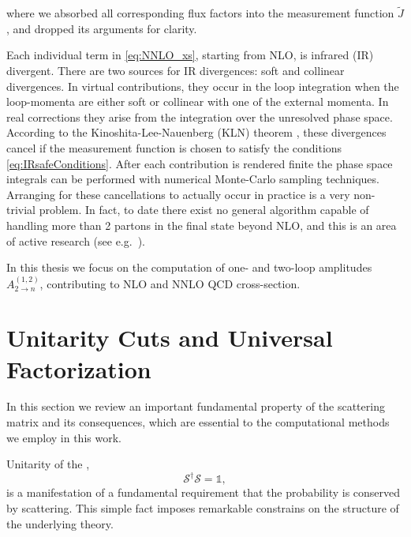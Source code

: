 where we absorbed all corresponding flux factors into the measurement function $\tilde{J}$, and dropped  its arguments for clarity. 

Each individual term in \cref{eq:NNLO_xs}, starting from NLO, is infrared (IR) divergent.
There are two sources for IR divergences: soft and collinear divergences.
In virtual contributions, they occur in the loop integration when the loop-momenta are
either soft or collinear with one of the external momenta.
In real corrections they arise from the integration over the unresolved phase space.
According to the Kinoshita-Lee-Nauenberg (KLN) theorem \cite{Kinoshita1962,Lee1964},
these divergences cancel if the measurement function is chosen to satisfy the conditions \eqref{eq:IRsafeConditions}.
After each contribution is rendered finite the phase space integrals can be performed with numerical Monte-Carlo sampling techniques.
Arranging for these cancellations to actually occur in practice is a very non-trivial problem.
In fact, to date there exist no general algorithm capable of handling more than 2 partons in the final state beyond NLO,
and this is an area of active research (see e.g.\ \cite{Catani:2007vq,Somogyi:2006da,Somogyi:2006cz,GehrmannDeRidder:2005cm,Gaunt:2015pea,Czakon:2010td,Czakon:2011ve,Anastasiou:2003gr}).

In this thesis we focus on the computation of one- and two-loop amplitudes $A^{(1,2)}_{2\to n}$, contributing
to NLO and NNLO QCD cross-section.


\section{Unitarity Cuts and Universal Factorization}
\label{sec:unitarity}

In this section we review an important fundamental property of the scattering matrix and its consequences,
which are essential to the computational methods we employ in this work.

Unitarity of the \sma{},
\begin{equation} \label{eq:unitarity_smatrix}
  \mathcal{S}^\dagger \mathcal{S} = \mathbb{1},
\end{equation}
is a manifestation of a
fundamental requirement that the probability is conserved by scattering.
This simple fact imposes remarkable constrains on the structure of the underlying theory.

